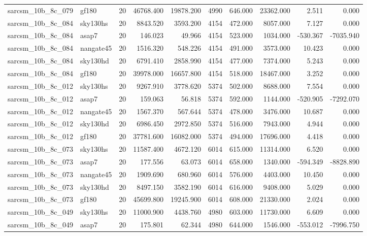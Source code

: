 \documentclass{article}
\begin{document}
\begin{longtable}{llrrrrrrrr}
sarcsm\_10b\_8c\_079 & gf180 & 20 & 46768.400 & 19878.200 & 4990 & 646.000 & 23362.000 & 2.511 & 0.000 \\
sarcsm\_10b\_8c\_084 & sky130hs & 20 & 8843.520 & 3593.200 & 4154 & 472.000 & 8057.000 & 7.127 & 0.000 \\
sarcsm\_10b\_8c\_084 & asap7 & 20 & 146.023 & 49.966 & 4154 & 523.000 & 1034.000 & -530.367 & -7035.940 \\
sarcsm\_10b\_8c\_084 & nangate45 & 20 & 1516.320 & 548.226 & 4154 & 491.000 & 3573.000 & 10.423 & 0.000 \\
sarcsm\_10b\_8c\_084 & sky130hd & 20 & 6791.410 & 2858.990 & 4154 & 477.000 & 7374.000 & 5.243 & 0.000 \\
sarcsm\_10b\_8c\_084 & gf180 & 20 & 39978.000 & 16657.800 & 4154 & 518.000 & 18467.000 & 3.252 & 0.000 \\
sarcsm\_10b\_8c\_012 & sky130hs & 20 & 9267.910 & 3778.620 & 5374 & 502.000 & 8688.000 & 7.554 & 0.000 \\
sarcsm\_10b\_8c\_012 & asap7 & 20 & 159.063 & 56.818 & 5374 & 592.000 & 1144.000 & -520.905 & -7292.070 \\
sarcsm\_10b\_8c\_012 & nangate45 & 20 & 1567.370 & 567.644 & 5374 & 478.000 & 3476.000 & 10.687 & 0.000 \\
sarcsm\_10b\_8c\_012 & sky130hd & 20 & 6986.450 & 2972.850 & 5374 & 516.000 & 7943.000 & 4.944 & 0.000 \\
sarcsm\_10b\_8c\_012 & gf180 & 20 & 37781.600 & 16082.000 & 5374 & 494.000 & 17696.000 & 4.418 & 0.000 \\
sarcsm\_10b\_8c\_073 & sky130hs & 20 & 11587.400 & 4672.120 & 6014 & 615.000 & 11314.000 & 6.520 & 0.000 \\
sarcsm\_10b\_8c\_073 & asap7 & 20 & 177.556 & 63.073 & 6014 & 658.000 & 1340.000 & -594.349 & -8828.890 \\
sarcsm\_10b\_8c\_073 & nangate45 & 20 & 1909.690 & 680.960 & 6014 & 576.000 & 4403.000 & 10.450 & 0.000 \\
sarcsm\_10b\_8c\_073 & sky130hd & 20 & 8497.150 & 3582.190 & 6014 & 616.000 & 9408.000 & 5.029 & 0.000 \\
sarcsm\_10b\_8c\_073 & gf180 & 20 & 45699.800 & 19245.900 & 6014 & 608.000 & 21330.000 & 2.024 & 0.000 \\
sarcsm\_10b\_8c\_049 & sky130hs & 20 & 11000.900 & 4438.760 & 4980 & 603.000 & 11730.000 & 6.609 & 0.000 \\
sarcsm\_10b\_8c\_049 & asap7 & 20 & 175.801 & 62.344 & 4980 & 644.000 & 1546.000 & -553.012 & -7996.750 \\

\end{longtable}
\end{document}
